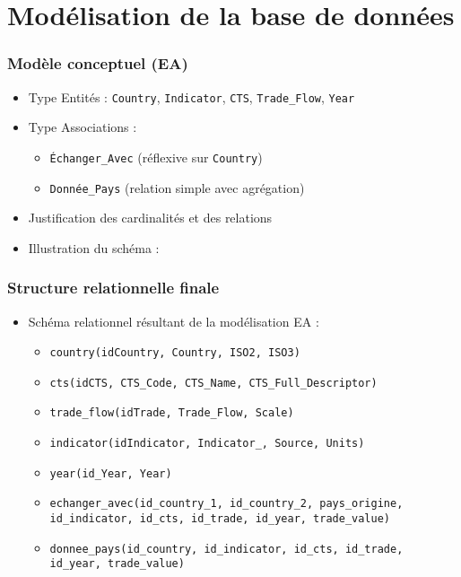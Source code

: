 \documentclass[11pt]{beamer}
\begin{document}
\section{Modélisation de la base de données}
\begin{frame}
  \frametitle{Modèle conceptuel (EA)}
  \begin{itemize}
    \item<1-> Type Entités : \texttt{Country}, \texttt{Indicator}, \texttt{CTS}, \texttt{Trade\_Flow}, \texttt{Year}
    \item<2-> Type Associations : 
      \begin{itemize}
        \item \texttt{Échanger\_Avec} (réflexive sur \texttt{Country})
        \item \texttt{Donnée\_Pays} (relation simple avec agrégation)
      \end{itemize}
    \item<3-> Justification des cardinalités et des relations
    \item<4-> Illustration du schéma : 
  \end{itemize}
\end{frame}

\begin{frame}
  \frametitle{Structure relationnelle finale}
  \begin{itemize}
    \item Schéma relationnel résultant de la modélisation EA :
    \begin{itemize}
      \item \texttt{country(idCountry, Country, ISO2, ISO3)}
      \item \texttt{cts(idCTS, CTS\_Code, CTS\_Name, CTS\_Full\_Descriptor)}
      \item \texttt{trade\_flow(idTrade, Trade\_Flow, Scale)}
      \item \texttt{indicator(idIndicator, Indicator\_, Source, Units)}
      \item \texttt{year(id\_Year, Year)}
      \item \texttt{echanger\_avec(id\_country\_1, id\_country\_2, pays\_origine, id\_indicator, id\_cts, id\_trade, id\_year, trade\_value)}
      \item \texttt{donnee\_pays(id\_country, id\_indicator, id\_cts, id\_trade, id\_year, trade\_value)}
    \end{itemize}
  \end{itemize}
\end{frame}
\end{document}
